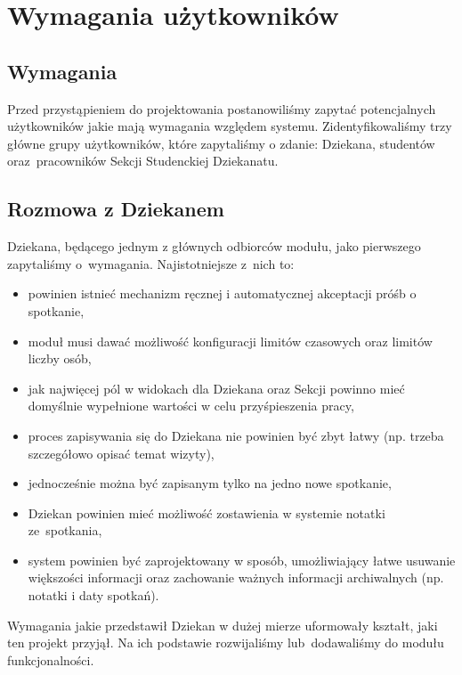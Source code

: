\documentclass[licencjacka]{pracamgr}
\begin{document}
\chapter{Wymagania użytkowników} \label{chap:wymagania}

\section{Wymagania}
Przed przystąpieniem do projektowania postanowiliśmy zapytać potencjalnych użytkowników jakie mają wymagania względem systemu. Zidentyfikowaliśmy trzy główne grupy użytkowników, które zapytaliśmy o zdanie: Dziekana, studentów oraz~pracowników Sekcji Studenckiej Dziekanatu.

\section{Rozmowa z Dziekanem}
Dziekana, będącego jednym z głównych odbiorców modułu, jako pierwszego zapytaliśmy o~wymagania. Najistotniejsze z~nich to:

\begin{itemize}
\setlength\itemsep{0,1em}
\item powinien istnieć mechanizm ręcznej i automatycznej akceptacji próśb o spotkanie,
\item moduł musi dawać możliwość konfiguracji limitów czasowych oraz limitów liczby osób,
\item jak najwięcej pól w widokach dla Dziekana oraz Sekcji powinno mieć domyślnie wypełnione wartości w celu przyśpieszenia pracy,
\item proces zapisywania się do Dziekana nie powinien być zbyt łatwy (np. trzeba szczegółowo opisać temat wizyty),
\item jednocześnie można być zapisanym tylko na jedno nowe spotkanie,
\item Dziekan powinien mieć możliwość zostawienia w systemie notatki ze~spotkania,
\item system powinien być zaprojektowany w sposób, umożliwiający łatwe usuwanie większości informacji oraz zachowanie ważnych informacji archiwalnych (np. notatki i daty spotkań).
\end{itemize}
Wymagania jakie przedstawił Dziekan w dużej mierze uformowały kształt, jaki ten projekt przyjął. Na ich podstawie rozwijaliśmy lub~dodawaliśmy do modułu funkcjonalności.
\end{document}
